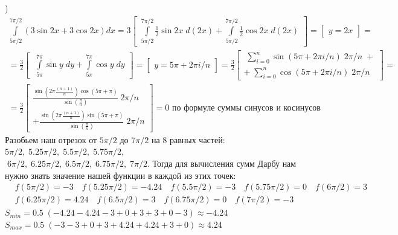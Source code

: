 \documentclass[a4paper,11pt]{article}
\begin{document}
)
\begin{gather*}
\int\limits_{5\pi/2}^{7\pi/2} (3\sin 2x + 3\cos 2x)dx =
3\begin{bmatrix}
\int\limits_{5\pi/2}^{7\pi/2} \frac12\sin 2x \; d(2x) + \int\limits_{5\pi/2}^{7\pi/2} \frac 12\cos 2x \; d(2x) 
\end{bmatrix} = \begin{bmatrix} y = 2x \end{bmatrix} = \\[2pt]
= \frac32\begin{bmatrix}
\;
\int\limits_{5\pi}^{7\pi} \sin y \; dy + \int\limits_{5\pi}^{7\pi} \cos y \; dy
\end{bmatrix} 
= \begin{bmatrix} y = 5\pi + 2\pi i/n \end{bmatrix} = 
\frac32\begin{bmatrix}
\;
\sum\limits_{i = 0}^{n} \sin (5\pi + 2\pi i/n) \; 2\pi / n \;  +\\[2pt] +  \; \sum\limits_{i = 0}^{n} \cos (5\pi + 2\pi i/n) \; 2\pi / n
\end{bmatrix} = \\[2pt]
= \frac32\begin{bmatrix} \frac{\sin(2\pi\frac{(n + 1)}{n})\cos(5\pi + \pi)}{\sin(\frac{\pi}{n})} \; 2\pi / n \\[5pt] + 
 \frac{\sin(2\pi\frac{(n + 1)}{n})\sin(5\pi + \pi)}{\sin(\frac{\pi}{n})} \; 2\pi / n
\end{bmatrix} = 0 \text{ по формуле суммы синусов и косинусов}
\end{gather*}
Разобьем наш отрезок от $ 5\pi/2 $ до $ 7\pi/2 $ на 8 равных частей: $ 5\pi/2, \; 5.25\pi/2, \; 5.5\pi/2, \; 5.75\pi/2, $ \\ $ \; 6\pi/2, \; 6.25\pi/2, \; 6.5\pi/2, \; 6.75\pi/2, \; 7\pi/2$. Тогда для вычисления сумм Дарбу нам нужно знать значение нашей функции в каждой из этих точек:
\begin{align*}
&f(5\pi/2) = -3 \quad f(5.25\pi/2) = -4.24 \quad f(5.5\pi/2) = -3 \quad f(5.75\pi/2) = 0 \quad f(6\pi/2) = 3 \\ &f(6.25\pi/2) = 4.24 \quad f(6.5\pi/2) = 3 \quad f(6.75\pi/2) = 0 \quad f(7\pi/2) = -3
\end{align*}
$ S_{min} = 0.5 \; (-4.24 - 4.24 - 3 + 0 + 3 + 3 + 0 - 3) \approx -4.24 $ \\
$ S_{max} = 0.5 \; (-3 - 3 + 0 + 3 + 4.24 + 4.24 + 3 + 0) \approx 4.24 $ \\ \\[5pt]
\\ \\ 
\end{document}
